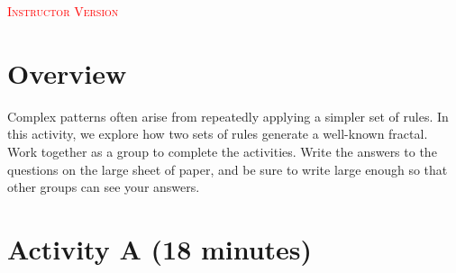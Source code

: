 \documentclass{article}
\begin{document}
\noindent\textcolor{red}{\textsc{Instructor Version}}

\section*{Overview}

Complex patterns often arise from repeatedly applying a simpler set of rules.
In this activity, we explore how two sets of rules generate a well-known fractal.\\

\noindent Work together as a group to complete the activities. Write the
answers to the questions on the large sheet of paper, and be sure to write
large enough  so that other groups can see your answers.

\section*{Activity A (18 minutes)}
\end{document}
